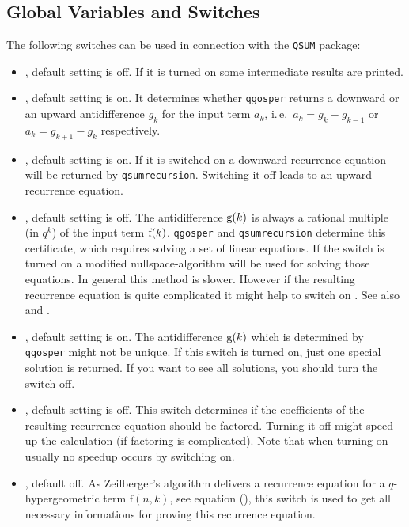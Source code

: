 \subsection{Global Variables and Switches}
\label{switches}

The following switches can be used in connection with
the \texttt{QSUM} package:
%
\begin{itemize}
	\item {}, default setting is off. If it is
		turned on some intermediate results are printed.
	\item {}, default setting is on. It determines
		whether \texttt{qgosper} returns a downward or an upward
		antidifference $g_k$ for the input term $a_k$,
	   i.\,e.\ $a_k=g_k-g_{k-1}$ or $a_k=g_{k+1}-g_k$ respectively.
	\item {}, default setting is on. If it is
		switched on a downward recurrence equation will be returned by
		\texttt{qsumrecursion}. Switching it off leads to an upward
		recurrence equation.
	\item {}, default setting is off. The
		antidifference ${\mathrm g}(k)$ is always a rational multiple (in $q^k$)
		of the input term ${\mathrm f}(k)$. \texttt{qgosper} and \texttt{qsumrecursion}
		determine this certificate, which requires solving a set of
		linear equations. If the switch  is
		turned on a modified nullspace-algorithm will be used for
		solving those equations. In general this method is slower.
		However if the resulting recurrence equation is quite complicated
		it might help to switch on .
		See also \cite{Knuth:TAoCP2} and \cite{PauleRiese:95}.
	\item {}, default setting is on. The
		antidifference ${\mathrm g}(k)$ which is determined by
		\texttt{qgosper} might not be unique. If this switch is turned on,
		just one special solution is returned. If you want
		to see all solutions, you should turn the switch off.
	\item {}, default setting is off. This
		switch determines if the coefficients of the
		resulting recurrence equation should
		be factored. Turning it off might speed up the calculation
		(if factoring is complicated). Note that
		when turning on  usually no speedup
		occurs by switching  on.
	\item {}, default off.
		As Zeilberger's algorithm
		delivers a recurrence equation for a $q$-hypergeometric term
		$\mathrm{f}(n,k)$, see equation (),
		this switch is used to get all necessary informations for
		proving this recurrence equation.


\end{itemize}
